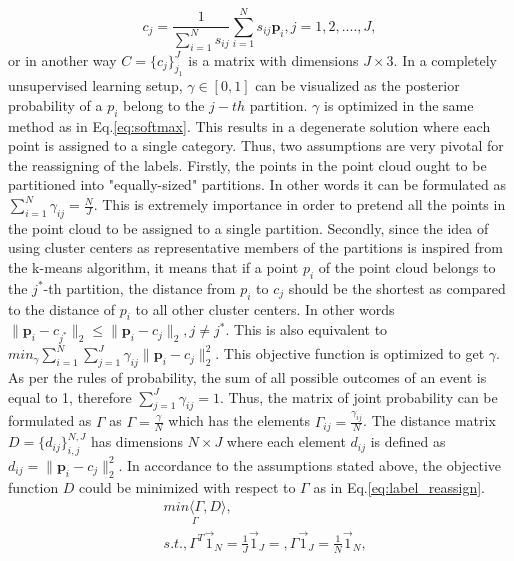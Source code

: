 \begin{equation}
    \label{eq:soft_mean}
    \mathit{c_{j}}= \mathit{\frac{1}{\sum_{i=1}^{N}s_{ij}}\sum_{i=1}^{N}s_{ij}\mathbf{p}_i, j = 1,2,....,J}, 
\end{equation}
or in another way $C= \{c_j\}_{j_1}^J$ is a matrix with dimensions $J \times 3$. In a completely unsupervised learning setup, $\gamma \in [0,1]$ can be visualized as the posterior probability of a $p_i$ belong to the $j-th$ partition. $\gamma$ is optimized in the same method as in Eq.\ref{eq:softmax}. This results in a degenerate solution where each point is assigned to a single category. Thus, two assumptions are very pivotal for the reassigning of the labels. Firstly, the points in the point cloud ought to be partitioned into "equally-sized" partitions. In other words it can be formulated as $\mathit{\sum_{i=1}^{N}\gamma_{ij} = \frac{N}{J}}$. This is extremely importance in order to pretend all the points in the point cloud to be assigned to a single partition. Secondly, since the idea of using cluster centers as representative members of the partitions is inspired from the k-means algorithm, it means that if a point $p_i$ of the point cloud belongs to the $j^{*}$-th partition, the distance from $p_i$ to $c_j$ should be the shortest as compared to the distance of $p_i$ to all other cluster centers. In other words $ \lVert \mathbf{p}_i - c_{j^*} \rVert _2 \leq \lVert \mathbf{p}_i - c_{j} \rVert _2, j \neq j^* $. This is also equivalent to $ min_{\gamma}\sum_{i=1}^{N}\sum_{j=1}^{J} \gamma_{ij} \lVert \mathbf{p}_i - c_{j} \rVert _2^2$. This objective function is optimized to get $\gamma$. As per the rules of probability, the sum of all possible outcomes of an event is equal to 1, therefore $\sum_{j=1}^{J} \gamma_{ij} = 1$. Thus, the matrix of joint probability can be formulated as $\Gamma$ as $\Gamma = \frac{\gamma}{N}$ which has the elements $\Gamma_{ij} = \frac{\gamma_{ij}}{N}$. The distance matrix $\mathit{D = \{d_{ij}\}_{i,j}^{N,J}}$ has dimensions $\mathit{N \times J}$ where each element $\mathit{d_{ij}}$ is defined as $\mathit{d_{ij}} = \lVert \mathbf{p}_i - c_{j} \rVert _2^2$. In accordance to the assumptions stated above, the objective function $\mathit{D}$ could be minimized with respect to $\Gamma$ as in Eq.\ref{eq:label_reassign}.
\begin{equation}
    \label{eq:label_reassign}
    \begin{split}
        &\underset{\Gamma}{min \langle \Gamma, D \rangle},\\
        &s.t., \Gamma^{T}\vec{1}_{\mathit{N}} = \frac{1}{\mathit{J}}\vec{1}_{J} =, \Gamma\vec{1}_{J} = \frac{1}{\mathit{N}}\vec{1}_{\mathit{N}},
    \end{split}    
\end{equation}
